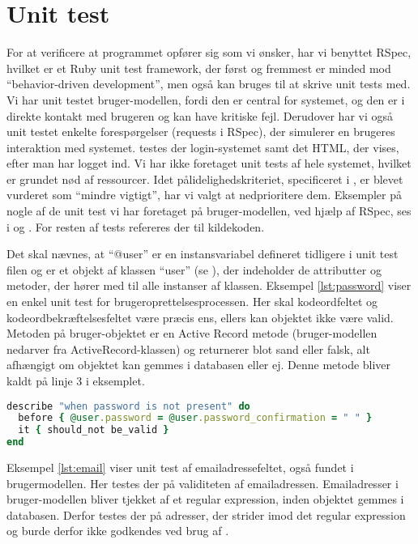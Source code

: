 \section{Unit test}
\label{sec:unittests}
For at verificere at programmet opfører sig som vi ønsker, har vi benyttet RSpec, hvilket er et Ruby unit test framework, der først og fremmest er minded mod ``behavior-driven development'', men også kan bruges til at skrive unit tests med. Vi har unit testet bruger-modellen, fordi den er central for systemet, og den er i direkte kontakt med brugeren og kan have kritiske fejl. Derudover har vi også unit testet enkelte forespørgelser (requests i RSpec), der simulerer en brugeres interaktion med systemet. \Fx testes der login-systemet samt det HTML, der vises, efter man har logget ind. Vi har ikke foretaget unit tests af hele systemet, hvilket er grundet nød af ressourcer. Idet pålidelighedskriteriet, specificeret i , er blevet vurderet som ``mindre vigtigt'', har vi valgt at nedprioritere dem. Eksempler på nogle af de unit test vi har foretaget på bruger-modellen, ved hjælp af RSpec, ses i  og . For resten af tests refereres der til kildekoden.


Det skal nævnes, at ``@user'' er en instansvariabel defineret tidligere i unit test filen og er et objekt af klassen ``user'' (se ), der indeholder de attributter og metoder, der hører med til alle instanser af klassen. Eksempel \ref{lst:password} viser en enkel unit test for brugeroprettelsesprocessen. Her skal kodeordfeltet og kodeordbekræftelsesfeltet være præcis ens, ellers kan objektet ikke være valid. Metoden  på bruger-objektet er en Active Record metode (bruger-modellen nedarver fra ActiveRecord-klassen) og returnerer blot sand eller falsk, alt afhængigt om objektet kan gemmes i databasen eller ej. Denne metode bliver kaldt på linje 3 i eksemplet.

\begin{lstlisting}[caption={Unit test af brugerens har indtastede password, når han/hun opretter sig som bruger},label=lst:password,language=Ruby]
describe "when password is not present" do
  before { @user.password = @user.password_confirmation = " " }
  it { should_not be_valid }
end
\end{lstlisting}

Eksempel \ref{lst:email} viser unit test af emailadressefeltet, også fundet i brugermodellen. Her testes der på validiteten af emailadressen. Emailadresser i bruger-modellen bliver tjekket af et regular expression, inden objektet gemmes i databasen. Derfor testes der på adresser, der strider imod det regular expression og burde derfor ikke godkendes ved brug af .

